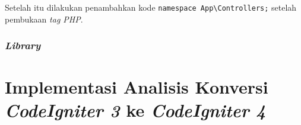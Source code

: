 Setelah itu dilakukan penambahkan kode \verb|namespace App\Controllers;| setelah pembukaan \textit{tag PHP}.
\subsubsection{\textit{Library}}

\section{Implementasi Analisis Konversi \textit{CodeIgniter 3} ke \textit{CodeIgniter 4}}